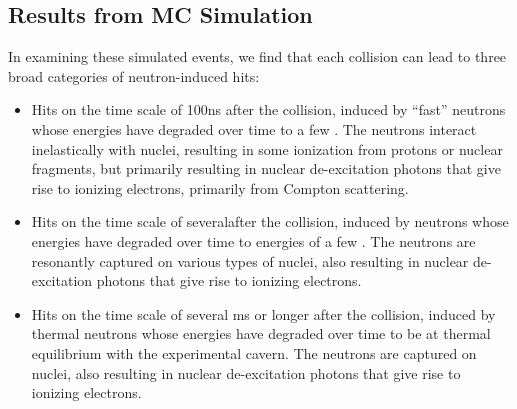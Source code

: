 \subsection{Results from MC Simulation}
In examining these simulated events, we find that each \pp collision can lead to three broad categories of neutron-induced hits:

\begin{itemize}
	\item Hits on the time scale of 100\unit{ns} after the \pp collision, induced by ``fast'' neutrons whose energies have degraded over time to a few \MeVns. The neutrons interact inelastically with nuclei, resulting in some ionization from protons or nuclear fragments, but primarily resulting in nuclear de-excitation photons that give rise to ionizing electrons, primarily from Compton scattering.

	\item Hits on the time scale of several\mus after the \pp collision, induced by neutrons whose energies have degraded over time to energies of a few \keVns. The neutrons are resonantly captured on various types of nuclei, also resulting in nuclear de-excitation photons that give rise to ionizing electrons.

	\item Hits on the time scale of several ms or longer after the \pp collision, induced by thermal neutrons whose energies have degraded over time to be at thermal equilibrium with the experimental cavern. The neutrons are captured on nuclei, also resulting in nuclear de-excitation photons that give rise to ionizing electrons.
\end{itemize}

